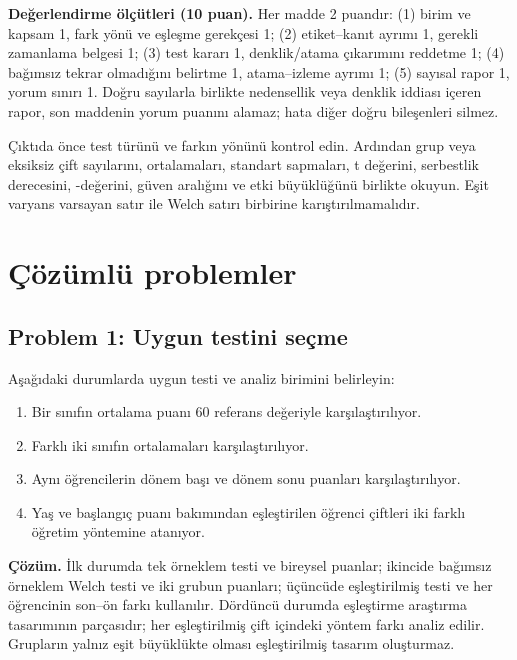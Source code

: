 \textbf{Değerlendirme ölçütleri (10 puan).} Her madde 2 puandır:
(1) birim ve kapsam 1, fark yönü ve eşleşme gerekçesi 1;
(2) etiket--kanıt ayrımı 1, gerekli zamanlama belgesi 1;
(3) test kararı 1, denklik/atama çıkarımını reddetme 1;
(4) bağımsız tekrar olmadığını belirtme 1, atama--izleme ayrımı 1;
(5) sayısal rapor 1, yorum sınırı 1.
Doğru sayılarla birlikte nedensellik veya denklik iddiası içeren rapor,
son maddenin yorum puanını alamaz; hata diğer doğru bileşenleri silmez.

\begin{outputguidebox}
Çıktıda önce test türünü ve farkın yönünü kontrol edin. Ardından grup veya
eksiksiz çift sayılarını, ortalamaları, standart sapmaları, t değerini,
serbestlik derecesini, \pval-değerini, güven aralığını ve etki büyüklüğünü birlikte
okuyun. Eşit varyans varsayan satır ile Welch satırı birbirine
karıştırılmamalıdır.
\end{outputguidebox}



\section{Çözümlü problemler}

\subsection*{Problem 1: Uygun \tstat testini seçme}

Aşağıdaki durumlarda uygun testi ve analiz birimini belirleyin:

\begin{enumerate}[label=\alph*)]
  \item Bir sınıfın ortalama puanı 60 referans değeriyle karşılaştırılıyor.
  \item Farklı iki sınıfın ortalamaları karşılaştırılıyor.
  \item Aynı öğrencilerin dönem başı ve dönem sonu puanları karşılaştırılıyor.
  \item Yaş ve başlangıç puanı bakımından eşleştirilen öğrenci çiftleri iki
  farklı öğretim yöntemine atanıyor.
\end{enumerate}

\textbf{Çözüm.} İlk durumda tek örneklem \tstat testi ve bireysel puanlar;
ikincide bağımsız örneklem Welch testi ve iki grubun puanları; üçüncüde
eşleştirilmiş \tstat testi ve her öğrencinin son--ön farkı kullanılır. Dördüncü
durumda eşleştirme araştırma tasarımının parçasıdır; her eşleştirilmiş çift
içindeki yöntem farkı analiz edilir. Grupların yalnız eşit büyüklükte olması
eşleştirilmiş tasarım oluşturmaz.

